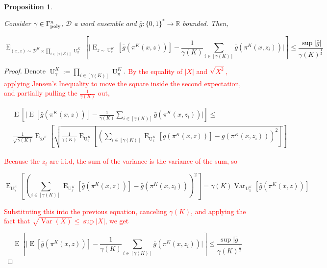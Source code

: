 \documentclass[11pt]{article}
\numberwithin{equation}{section}
\theoremstyle{definition}
\theoremstyle{plain}
\newtheorem{proposition}{Proposition}[section]
\newcommand{\Bool}{\{0,1\}}
\newcommand{\Words}{{\Bool^*}}
\DeclareMathOperator{\E}{E}
\DeclareMathOperator{\Var}{Var}
\DeclareMathOperator{\Un}{U}
\newcommand{\Reals}{\mathbb{R}}
\newcommand{\Abs}[1]{\lvert #1 \rvert}
\newcommand{\Dist}{\mathcal{D}}
\newcommand{\GammaPoly}{\Gamma_{\textnormal{poly}}}
\begin{document}
\begin{samepage}
\begin{proposition}
\label{prp:ev_equiv_mean}

Consider $\gamma \in \GammaPoly^n$, $\Dist$ a word ensemble and $\bar{g}: \Words \rightarrow \Reals$ bounded. Then,

\begin{equation}
\E_{(x,z) \sim \Dist^{K} \times \prod_{i \in [\gamma(K)]} \Un_\pi^K}[\Abs{\E_{z \sim \Un_\pi^{K}}[\bar{g}(\pi^{K}(x,z))]-\frac{1}{\gamma(K)} \sum_{i \in [\gamma(K)]} \bar{g}(\pi^K(x,z_i))}] \leq \frac{\sup \Abs{\bar{g}}}{\gamma(K)^{\frac{1}{2}}}
\end{equation}

\end{proposition}
\end{samepage}

\begin{proof}

Denote $\Un_\gamma^K:=\prod_{i \in [\gamma(K)]} \Un_\pi^K$. \textcolor{red}{By the equality of $\Abs{X}$ and $\sqrt{X^2}$, applying Jensen's Inequality to move the square inside the second expectation, and partially pulling the $\frac{1}{\gamma(K)}$ out,}

\begin{align*}
&\E[\Abs{\E[\bar{g}(\pi^{K}(x,z))]-\frac{1}{\gamma(K)} \sum_{i \in [\gamma(K)]} \bar{g}(\pi^K(x,z_i))}] \leq\\ &\frac{1}{\sqrt{\gamma(K)}}\E_{\Dist^{K}}\left[\sqrt{\frac{1}{\gamma(K)}\E_{\Un_\gamma^K}\left[\left(\sum_{i\in[\gamma(K)]}\E_{\Un_\pi^K}[\bar{g}(\pi^{K}(x,z))]- \bar{g}(\pi^K(x,z_i))\right)^2\right]}\right]
\end{align*}

\textcolor{red}{Because the $z_{i}$ are i.i.d, the sum of the variance is the variance of the sum, so}

\[\E_{\Un_\gamma^K}\left[\left(\sum_{i\in[\gamma(K)]}\E_{\Un_\pi^K}[\bar{g}(\pi^{K}(x,z))]- \bar{g}(\pi^K(x,z_i))\right)^2\right]=\gamma(K)\Var_{\Un_\pi^K}[\bar{g}(\pi^{K}(x,z))]\]

\textcolor{red}{Substituting this into the previous equation, canceling $\gamma(K)$, and applying the fact that $\sqrt{\Var(X)}\le\sup\Abs{X}$, we get}

\[\E[\Abs{\E[\bar{g}(\pi^{K}(x,z))]-\frac{1}{\gamma(K)} \sum_{i \in [\gamma(K)]} \bar{g}(\pi^K(x,z_i))}] \leq \frac{\sup\Abs{\overline{g}}}{\gamma(K)^{\frac{1}{2}}}\]
%
\end{proof}
\end{document}
